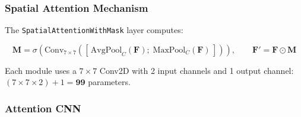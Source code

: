 \documentclass[12pt,a4paper]{article}
\begin{document}
\subsubsection{Spatial Attention Mechanism}

The \texttt{SpatialAttentionWithMask} layer computes:

\begin{equation}
    \mathbf{M} = \sigma\!\left(
        \text{Conv}_{7\times 7}\!\left(
            \left[\,\text{AvgPool}_{C}(\mathbf{F});\;
                  \text{MaxPool}_{C}(\mathbf{F})\,\right]
        \right)
    \right), \qquad
    \mathbf{F}' = \mathbf{F} \odot \mathbf{M}
\end{equation}

Each module uses a $7\times7$ Conv2D with 2 input channels and 1 output channel:
$(7\times7\times2)+1 = \mathbf{99}$ parameters.

\subsubsection{Attention CNN}
\end{document}
